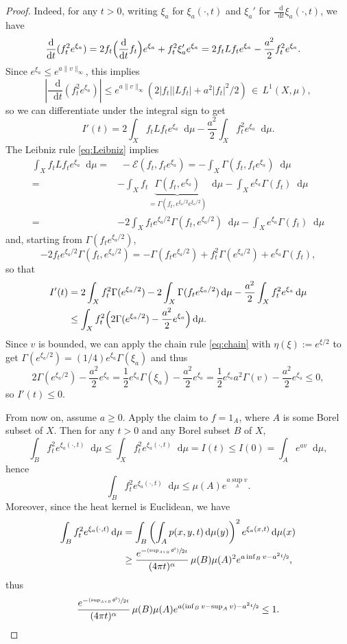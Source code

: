 \documentclass[JEP,XML,SOM,Unicode,published]{cedram}
\newcommand{\psfrac}[2]{\sfrac{(#1)}{#2}}
\theoremstyle{plain}
\theoremstyle{definition}
\newcommand{\cE}{\mathcal{E}}
\newcommand{\di}{\mathop{}\!\mathrm{d}}
\newcommand{\dist}{\mathsf{d}}
\begin{document}
\begin{proof}
Indeed, for any $t>0$, writing $\xi_a$ for $\xi_a(\cdot,t)$ and $\xi_a'$ for $\frac{\di}{\di t} \xi_a(\cdot,t)$, we have
\begin{align*}
\frac{\di}{\di t} (f_t^2e^{\xi_a}) & = 2 f_t \Bigl(\frac{\di}{\di t} f_t \Bigr)e^{\xi_a} + f_t^2\xi_a' e^{\xi_a} = 2 f_t Lf_t e^{\xi_a}-\frac{a^2}{2}f_t^2 e^{\xi_a}.
\end{align*}
Since $e^{\xi_a} \le e^{a \|v\|_\infty}$, this implies
\[
\left|\frac{\di}{\di t} (f_t^2e^{\xi_a}) \right| \le e^{a \|v\|_\infty}(2|f_t||Lf_t| + a^2|f_t|^2/2) \, \in \, L^1(X,\mu),
\]
so we can differentiate under the integral sign to get
\[
I'(t) = 2 \int_X f_t Lf_t e^{\xi_a} \di \mu - \frac{a^2}{2} \int_X f_t^2 e^{\xi_a} \di \mu.
\]
The Leibniz rule \eqref{eq:Leibniz} implies
\begin{align*}
\int_X f_t Lf_t e^{\xi_a} \di \mu = & \, \, - \cE(f_t,f_te^{\xi_a}) = - \int_X \Gamma(f_t,f_t e^{\xi_a}) \di \mu \\ = & - \int_X f_t \underbrace{\Gamma(f_t,e^{\xi_a})}_{=\Gamma(f_t,e^{\xi_a/2}e^{\xi_a/2})} \di \mu - \int_X e^{\xi_a} \Gamma(f_t) \di \mu\\
= & - 2 \int_X f_t e^{\xi_a/2} \Gamma(f_t,e^{\xi_a/2})\di \mu - \int_X e^{\xi_a} \Gamma(f_t) \di \mu
\end{align*}
and, starting from $\Gamma(f_te^{\xi_a/2})$,
\[
- 2 f_t e^{\xi_a/2} \Gamma(f_t,e^{\xi_a/2}) = - \Gamma(f_te^{\xi_a/2}) + f_t^2 \Gamma(e^{\xi_a/2}) + e^{\xi_a} \Gamma(f_t),
\]
so that
\begin{align*}
I'(t) & = 2 \int_X f_t^2 \Gamma(e^{\xi_a/2}) - 2 \int_X \Gamma(f_t e^{\xi_a/2})\di \mu - \frac{a^2}{2}\int_X f_t^2 e^{\xi_a} \di \mu \\ & \le \int_X f_t^2 \Bigl(2 \Gamma(e^{\xi_a/2})-\frac{a^2}{2} e^{\xi_a} \Bigr) \di \mu.
\end{align*}
Since $v$ is bounded, we can apply the chain rule \eqref{eq:chain} with $\eta(\xi):=e^{\xi/2}$ to get $\Gamma(e^{\xi_a/2})=(1/4)e^{\xi_a}\Gamma(\xi_a)$ and thus
\[
2 \Gamma(e^{\xi_a/2}) - \frac{a^2}{2}e^{\xi_a} = \frac{1}{2}e^{\xi_a}\Gamma(\xi_a) - \frac{a^2}{2}e^{\xi_a} = \frac{1}{2}e^{\xi_a} a^2 \Gamma(v)-\frac{a^2}{2}e^{\xi_a}\le 0,
\]
so $I'(t) \le 0$.

From now on, assume $a \ge 0$. Apply the claim to $f=1_A$, where $A$ is some Borel subset of $X$. Then for any $t>0$ and any Borel subset $B$ of $X$,
\[
\int_B f_t^2 e^{\xi_a(\cdot,t)} \di \mu \le \int_X f_t^2 e^{\xi_a(\cdot,t)} \di \mu =I(t)\le I(0) = \int_{A} e^{a v} \di \mu,
\]
hence
\[
\int_B f_t^2 e^{\xi_a(\cdot,t)} \di \mu \le \mu(A) e^{a \sup_A v}.
\]
Moreover, since the heat kernel is Euclidean, we have
\begin{align*}
\int_B f_t^2 e^{\xi_a(\cdot,t)} \di \mu & = \int_{B} \left(\int_A p(x,y,t) \di \mu(y)\right)^2 e^{\xi_a(x,t)} \di \mu(x)\\ & \ge \frac{e^{-\psfrac{\sup_{A\times B} \dist^2}{2t}}}{(4\pi t)^\alpha}\, \mu(B) \mu(A)^2 e^{a \inf_B v - a^2 \sfrac{t}{2}},
\end{align*}
thus
\[
\frac{e^{-\psfrac{\sup_{A\times B} \dist^2}{2t}}}{(4\pi t)^\alpha}\, \mu(B) \mu(A) e^{a (\inf_B v - \sup_A v) - a^2 \sfrac{t}{2}} \le 1.
\]


\end{proof}
\end{document}
